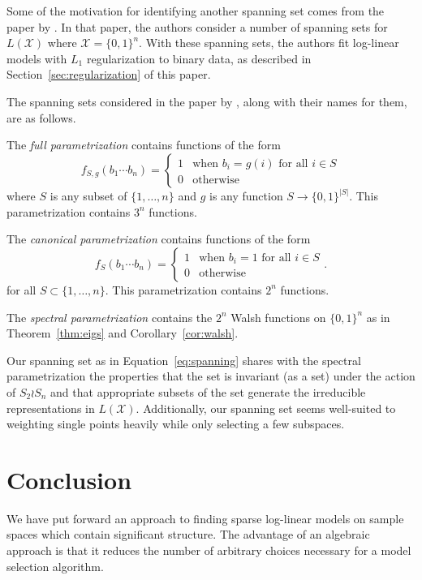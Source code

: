 \documentclass[cclicense]{hmcthesis}
\providecommand*{\xs}{\mathcal X}
\numberwithin{equation}{chapter}
\numberwithin{thmcounter}{chapter}
\begin{document}
    Some of the motivation for identifying another spanning set comes from the
    paper by \citet{SPEC}.  In that paper, the authors consider a number of
    spanning sets for $L(\xs)$ where $\xs = \{0, 1\}^n$.  With these spanning
    sets, the authors fit log-linear models with $L_1$ regularization to binary
    data, as described in Section~\ref{sec:regularization} of this paper.

    The spanning sets considered in the paper by \citet{SPEC}, along with their
    names for them, are as follows.

    The \emph{full parametrization} contains functions of the form
    \[
        f_{S, g}(b_1 \cdots b_n) = \begin{cases}
            1 & \text{when $b_i = g(i)$ for all $i \in S$} \\
            0 & \text{otherwise}
        \end{cases}
    \]
    where $S$ is any subset of $\{1, \ldots, n\}$ and $g$ is any function $S \to
    \{0, 1\}^{|S|}$.  This parametrization contains $3^n$ functions.

    The \emph{canonical parametrization} contains functions of the form
    \[
        f_S(b_1 \cdots b_n) = \begin{cases}
            1 & \text{when $b_i = 1$ for all $i \in S$} \\
            0 & \text{otherwise}
        \end{cases}.
    \]
    for all $S \subset \{1, \ldots, n\}$.  This parametrization contains $2^n$
    functions.

    The \emph{spectral parametrization} contains the $2^n$ Walsh functions on
    $\{0, 1\}^n$ as in Theorem~\ref{thm:eigs} and Corollary~\ref{cor:walsh}.

    Our spanning set as in Equation~\ref{eq:spanning} shares with the spectral
    parametrization the properties that the set is invariant (as a set) under
    the action of $S_2 \wr S_n$ and that appropriate subsets of the set generate
    the irreducible representations in $L(\xs)$.  Additionally, our spanning set
    seems well-suited to weighting single points heavily while only selecting a
    few subspaces.



\chapter{Conclusion}

    We have put forward an approach to finding sparse log-linear models on
    sample spaces which contain significant structure.  The advantage of an
    algebraic approach is that it reduces the number of arbitrary choices
    necessary for a model selection algorithm.
\end{document}

